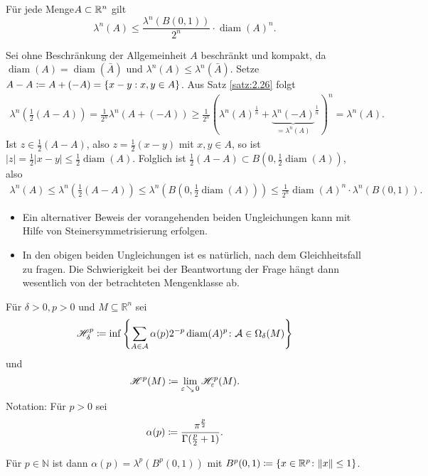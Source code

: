 \documentclass[a4paper,twoside,DIV15,BCOR12mm]{scrbook}
\newcommand{\HM}{\mathscr H}
\DeclareMathOperator{\diam}{diam}
\DeclareMathOperator{\downto}{\searrow}
\begin{document}
\begin{satz}
\label{satz:2.27}
Für jede Menge$A\subset \mathbb{R}^n$ gilt
\[
\lambda^n(A)  \le \frac{\lambda^n(B(0,1))}{2^n} \cdot \diam(A)^n.
\]
\end{satz}

\begin{beweis}
Sei ohne Beschränkung der Allgemeinheit $A$ beschränkt und kompakt, da $\diam(A) = \diam(\bar A)$ und $\lambda^n(A) \le \lambda^n(\bar A)$. Setze $A-A \da A + (-A) = \{ x-y : x,y\in A\}$. Aus Satz \ref{satz:2.26} folgt
\begin{align*}
\lambda^n(\frac12(A-A)) = \frac1{2^n} \lambda^n(A + (-A)) \ge \frac 1{2^n} \left(\lambda^n(A)^{\frac1n} + {\underbrace{\lambda^n(-A)}_{=\lambda^n(A)}}^{\frac1n}\right)^n = \lambda^n(A).
\end{align*}
Ist $z\in\frac12(A-A)$, also $z=\frac12(x-y)$ mit $x,y\in A$, so ist $|z| = \frac 12 |x-y| \le \frac12 \diam(A)$. Folglich ist $\frac12(A-A) \subset B(0,\frac12\diam(A))$, also
\begin{align*}
\lambda^n(A) \le \lambda^n(\frac12(A-A)) \le \lambda^n(B(0,\frac12\diam(A))) \le \frac1{2^n} \diam(A)^n \cdot \lambda^n(B(0,1)).
\end{align*}
\end{beweis}

\begin{bemerkung}
\begin{itemize}
\item Ein alternativer Beweis der vorangehenden beiden Ungleichungen kann mit Hilfe 
von Steinersymmetrisierung erfolgen.
\item In den obigen beiden Ungleichungen ist es natürlich, nach dem Gleichheitsfall 
zu fragen. Die Schwierigkeit bei der Beantwortung der Frage hängt dann wesentlich von 
der betrachteten Mengenklasse ab.
\end{itemize}
\end{bemerkung}

\begin{definition}
Für \(\delta > 0, p>0\) und \(M \subseteq \mathbb R^n\) sei
\[
\HM^p_\delta \da \inf\left\{ \sum_{A\in\mathcal A} \alpha(p) 2^{-p} \diam(A)^p \colon \mathcal A \in \Omega_\delta(M) \right\}
\]
und
\[
\HM^p(M) \da \lim_{\varepsilon\downto0} \HM^p_\varepsilon(M).
\]
Notation: Für \(p>0\) sei
\[
\alpha(p) \da \frac{\pi^{\frac{p}2}}{\Gamma(\frac{p}2+1)} .
\]
\end{definition}

Für $p\in\mathbb{N}$ ist dann  \(\alpha(p) = \lambda^p(B^p(0,1))\) mit \(B^p(0,1) \da \{ x \in \mathbb R^p \colon \|x\| \leq 1 \}\).
\end{document}
